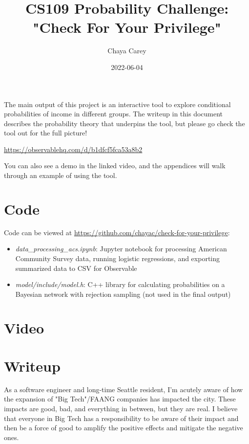 \documentclass[11pt]{article}
\title{CS109 Probability Challenge: "Check For Your Privilege"}
\author{Chaya Carey}
\date{2022-06-04}
\begin{document}




The main output of this project is an interactive tool to explore conditional probabilities of income in different groups. The writeup in this document describes the probability theory that underpins the tool, but please go check the tool out for the full picture!

\href{https://observablehq.com/d/b1dfcf5fca53a8b2}{https://observablehq.com/d/b1dfcf5fca53a8b2}

You can also see a demo in the linked video, and the appendices will walk through an example of using the tool.

\section{Code}
Code can be viewed at \href{https://github.com/chayac/check-for-your-privilege}{https://github.com/chayac/check-for-your-privilege}:
\begin{itemize}
    \item \textit{data\_processing\_acs.ipynb}: Jupyter notebook for processing American Community Survey data, running logistic regressions, and exporting summarized data to CSV for Observable
    \item \textit{model/include/model.h}: C++ library for calculating probabilities on a Bayesian network with rejection sampling (not used in the final output)
\end{itemize}

\section{Video}

\newpage

\section{Writeup}

As a software engineer and long-time Seattle resident, I'm acutely aware of how the expansion of "Big Tech"/FAANG companies has impacted the city. These impacts are good, bad, and everything in between, but they are real. I believe that everyone in Big Tech has a responsibility to be aware of their impact and then be a force of good to amplify the positive effects and mitigate the negative ones.
\end{document}
